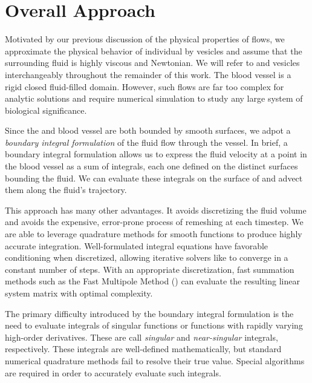 \section{Overall Approach}
Motivated by our previous discussion of the physical properties of \rbc flows, we approximate the physical behavior of individual \rbcs by vesicles and assume that the surrounding fluid is highly viscous and Newtonian.
We will refer to \rbcs and vesicles interchangeably throughout the remainder of this work.
The blood vessel is a rigid closed fluid-filled domain. 
However, such flows are far too complex for analytic solutions and require numerical simulation to study any large system of biological significance.

Since the \rbcs and blood vessel are both bounded by smooth surfaces, we adpot a \textit{boundary integral formulation} of the fluid flow through the vessel.
In brief, a boundary integral formulation allows us to express the fluid velocity at a point in the blood vessel as a sum of integrals, each one defined on the distinct surfaces bounding the fluid.
We can evaluate these integrals on the surface of \rbcs and advect them along the fluid's trajectory. 

This approach has many other advantages. 
It avoids discretizing the fluid volume and avoids the expensive, error-prone process of remeshing at each timestep.
We are able to leverage quadrature methods for smooth functions to produce highly accurate integration.
Well-formulated integral equations have favorable conditioning when discretized, allowing iterative solvers like \gmres to converge in a constant number of steps.
With an appropriate discretization, fast summation methods such as the Fast Multipole Method (\fmm) can evaluate the resulting linear system matrix with optimal complexity.

The primary difficulty introduced by the boundary integral formulation is the need to evaluate integrals of singular functions or functions with rapidly varying high-order derivatives. These are call \textit{singular} and \textit{near-singular} integrals, respectively.
These integrals are well-defined mathematically, but standard numerical quadrature methods fail to resolve their true value.
Special algorithms are required in order to accurately evaluate such integrals.

